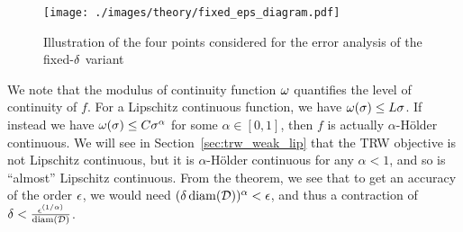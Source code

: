 \begin{figure} 
\centering
\texttt{[image: ./images/theory/fixed\_eps\_diagram.pdf]}
\vspace{-2mm}
\caption{Illustration of the four points considered for the error analysis of the fixed-$\delta$ variant}
\label{fig:fixed_eps_diagram}
\vspace{-3mm}
\end{figure}

We note that the modulus of continuity function $\omega$ quantifies the level of continuity of $f$. For a Lipschitz continuous function, we have $\omega(\sigma) \leq L \sigma$. If instead we have $\omega(\sigma) \leq C \sigma^\alpha$ for some $\alpha \in [0,1]$, then $f$ is actually $\alpha$-H\"{o}lder continuous. We will see in Section~\ref{sec:trw_weak_lip} that the TRW objective is not Lipschitz continuous, but it is  $\alpha$-H\"{o}lder continuous for any $\alpha < 1$, and so is ``almost'' Lipschitz continuous. From the theorem, we see that to get an accuracy of the order $\epsilon$, we would need $(\delta \operatorname{diam}(\mathcal{D}))^\alpha < \epsilon$, and thus a contraction of $\delta < \frac{\epsilon^{(1/\alpha)}}{\operatorname{diam}(\mathcal{D})}$.
